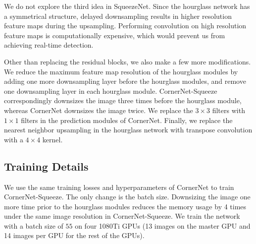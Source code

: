 \documentclass{bmvc2k}
\begin{document}
We do not explore the third idea in SqueezeNet. Since the hourglass network has a symmetrical structure, delayed downsampling results in higher resolution feature maps during the upsampling. Performing convolution on high resolution feature maps is computationally expensive, which would prevent us from achieving real-time detection.

\begin{table}[ht]
    \centering
    \def\arraystretch{1.1}
    \caption{Comparison between the residual block and the new fire module.}
    \label{tab:squeeze_module}
\end{table}

Other than replacing the residual blocks, we also make a few more modifications. We reduce the maximum feature map resolution of the hourglass modules by adding one more downsampling layer before the hourglass modules, and remove one downsampling layer in each hourglass module. CornerNet-Squeeze correspondingly downsizes the image three times before the hourglass module, whereas CornerNet downsizes the image twice. We replace the $3 \times 3$ filters with $1 \times 1$ filters in the prediction modules of CornerNet. Finally, we replace the nearest neighbor upsampling in the hourglass network with transpose convolution with a $4 \times 4$ kernel.

\subsection{Training Details}
\label{sec:cornernet_squeeze_details}
We use the same training losses and hyperparameters of CornerNet to train CornerNet-Squeeze. The only change is the batch size. Downsizing the image one more time prior to the hourglass modules reduces the memory usage by 4 times under the same image resolution in CornerNet-Squeeze. We train the network with a batch size of $55$ on four 1080Ti GPUs (13 images on the master GPU and 14 images per GPU for the rest of the GPUs).
\end{document}
